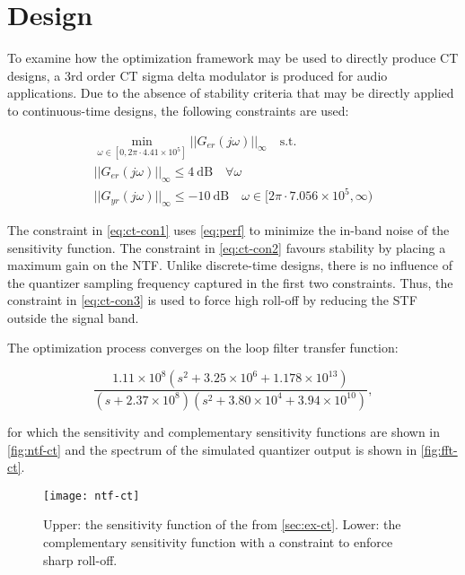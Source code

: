 \section{ Design}
\label{sec:ex-ct}

To examine how the optimization framework may be used to directly produce \gls{CT} designs, a 3rd order \gls{CT} sigma delta modulator is produced for audio applications. Due to the absence of stability criteria that may be directly applied to continuous-time designs, the following constraints are used:

\begin{gather}
	\min_{\omega \in [0, 2\pi\cdot4.41\times10^5]} ||G_{er}(j\omega)||_\infty \quad \textrm{s.t.} \label{eq:ct-con1} \\
	||G_{er}(j\omega)||_\infty \leq \SI{4}{\deci\bel} \quad \forall \omega \label{eq:ct-con2} \\
	||G_{yr}(j\omega)||_\infty \leq \SI{-10}{\deci\bel} \quad \omega \in [2\pi\cdot7.056\times10^5, \infty) \label{eq:ct-con3}
\end{gather}

The constraint in \autoref{eq:ct-con1} uses \autoref{eq:perf} to minimize the in-band noise of the sensitivity function. The constraint in \autoref{eq:ct-con2} favours stability by placing a maximum gain on the \gls{NTF}. Unlike discrete-time designs, there is no influence of the quantizer sampling frequency captured in the first two constraints. Thus, the constraint in \autoref{eq:ct-con3} is used to force high roll-off by reducing the \gls{STF} outside the signal band.

The optimization process converges on the loop filter transfer function:

\begin{equation*}
	\frac{1.11\times10^8\left(s^2 + 3.25\times10^6 + 1.178\times10^{13}\right)}{\left(s + 2.37\times10^8\right)\left(s^2 + 3.80\times10^4 + 3.94\times10^{10}\right)},
\end{equation*}

for which the sensitivity and complementary sensitivity functions are shown in \autoref{fig:ntf-ct} and the spectrum of the simulated quantizer output is shown in \autoref{fig:fft-ct}.

\begin{figure}
	\centering
	\texttt{[image: ntf-ct]}
	\caption{Upper: the sensitivity function of the  from \autoref{sec:ex-ct}. Lower: the complementary sensitivity function with a  constraint to enforce sharp roll-off.} \label{fig:ntf-ct}
\end{figure}

